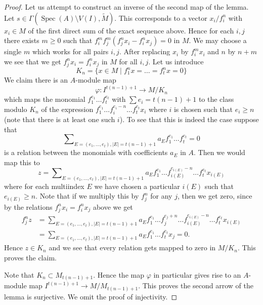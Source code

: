\documentclass{stacks-project}
\theoremstyle{plain}
\theoremstyle{definition}
\theoremstyle{remark}
\numberwithin{equation}{subsection}
\def\Spec{\mathop{\mathrm{Spec}}}
\begin{document}
\begin{proof}
\medskip\noindent
Let us attempt to construct an inverse of the second map of the lemma.
Let $s \in \Gamma(\Spec(A) \setminus V(I), \widetilde{M})$.
This corresponds to a vector $x_i/f_i^n$ with $x_i \in M$ of the
first direct sum of the exact sequence above.
Hence for each $i, j$ there exists $m \geq 0$
such that $f_i^m f_j^m (f_j^n x_i - f_i^n x_j) = 0$ in $M$.
We may choose a single $m$ which works for all pairs $i, j$.
After replacing $x_i$ by $f_i^mx_i$ and $n$ by $n + m$ we see
that we get $f_j^nx_i = f_i^nx_j$ in $M$ for all $i, j$.
Let us introduce
$$
K_n = \{x \in M \mid f_1^nx = \ldots = f_t^nx = 0\}
$$
We claim there is an $A$-module map
$$
\varphi :
I^{t(n - 1) + 1}
\longrightarrow
M/K_n
$$
which maps the monomial
$f_1^{e_1} \ldots f_t^{e_t}$ with $\sum e_i = t(n - 1) + 1$
to the class modulo $K_n$ of the expression
$f_1^{e_1} \ldots f_i^{e_i - n} \ldots f_t^{e_t}x_i$
where $i$ is chosen such that $e_i \geq n$ (note that there
is at least one such $i$).
To see that this is indeed the case suppose that
$$
\sum\nolimits_{E = (e_1, \ldots, e_t), |E| = t(n - 1) + 1}
a_E f_1^{e_1} \ldots f_t^{e_t} = 0
$$
is a relation between the monomials with coefficients $a_E$ in $A$.
Then we would map this to
$$
z =
\sum\nolimits_{E = (e_1, \ldots, e_t), |E| = t(n - 1) + 1}
a_E f_1^{e_1} \ldots f_{i(E)}^{e_{i(E)} - n} \ldots f_t^{e_t}x_{i(E)}
$$
where for each multiindex $E$ we have chosen a particular $i(E)$
such that $e_{i(E)} \geq n$.
Note that if we multiply this by $f_j^n$ for any $j$, then
we get zero, since by the relations $f_j^nx_i = f_i^nx_j$ above we get
\begin{align*}
f_j^nz & = \sum\nolimits_{E = (e_1, \ldots, e_t), |E| = t(n - 1) + 1}
a_E f_1^{e_1} \ldots f_j^{e_j + n}
\ldots f_{i(E)}^{e_{i(E)} - n} \ldots f_t^{e_t}x_{i(E)} \\
& =
\sum\nolimits_{E = (e_1, \ldots, e_t), |E| = t(n - 1) + 1}
a_E f_1^{e_1} \ldots f_t^{e_t}x_j
= 0.
\end{align*}
Hence $z \in K_n$ and we see that every relation gets mapped to zero
in $M/K_n$. This proves the claim.

\medskip\noindent
Note that $K_n \subset M_{t(n - 1) + 1}$. Hence the
map $\varphi$ in particular gives rise to an $A$-module map
$I^{t(n - 1) + 1} \to M/M_{t(n - 1) + 1}$.
This proves the second arrow of the lemma is surjective.
We omit the proof of injectivity.
\end{proof}
\end{document}
